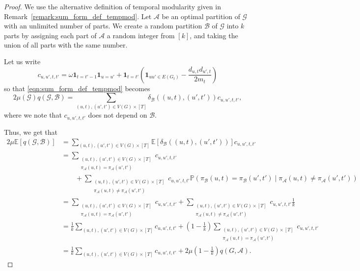 \documentclass[runningheads]{llncs}
\newcommand{\cA}{\mathcal{A}}
\newcommand{\cG}{\mathcal{G}}
\newcommand{\BB}{\mathcal{B}}
\newcommand{\ind}[1]{\mathbf{1}_{#1}}
\newcommand{\Exp}[1]{\mathbb{E}\left[#1\right]}
\newcommand{\Prob}[1]{\mathbb{P}\left(#1\right)}
\begin{document}
\begin{proof}
    We use the alternative definition of temporal modularity given in Remark~\ref{remark:sum_form_def_tempmod}. Let $\cA$ be an optimal partition of $\cG$ with an unlimited number of parts. We create a random partition $\BB$ of $\cG$ into $k$ parts by assigning each part of $\cA$ a random integer from $[k]$, and taking the union of all parts with the same number.

    Let us write
    $$c_{u,u',t,t'} = \omega\ind{t = t'-1}\ind{u = u'} + \ind{t = t'}\left(\ind{uu' \in E(G_t)} - \frac{d_{u,t} d_{u',t}}{2m_t}\right)$$
    so that \eqref{eqn:sum_form_def_tempmod} becomes
    $$2\mu(\cG) q(\cG,\BB) = \sum_{(u,t),(u',t') \in V(G)\times[T]} \delta_{\BB}((u,t),(u',t')) c_{u,u',t,t'},$$
    where we note that $c_{u,u',t,t'}$ does not depend on $\BB$.

    Thus, we get that
    \begin{align*}
        2\mu\Exp{q(\cG,\BB)} &= \sum_{(u,t),(u',t')\in V(G)\times [T]} \Exp{\delta_{\BB}((u,t),(u',t'))}c_{u,u',t,t'}\\
        &= \sum_{\substack{(u,t),(u',t')\in V(G)\times [T]\\\pi_\cA(u,t) = \pi_\cA(u',t')}} c_{u,u',t,t'}\\
        &\qquad + \sum_{\substack{(u,t),(u',t')\in V(G)\times [T]\\\pi_\cA(u,t) \neq \pi_\cA(u',t')}} c_{u,u',t,t'}\Prob{\pi_\BB(u,t) = \pi_\BB(u',t') \middle\vert \pi_\cA(u,t) \neq \pi_\cA(u',t')}\\
        &= \sum_{\substack{(u,t),(u',t')\in V(G)\times [T]\\\pi_\cA(u,t) = \pi_\cA(u',t')}} c_{u,u',t,t'} + \sum_{\substack{(u,t),(u',t')\in V(G)\times [T]\\\pi_\cA(u,t) \neq \pi_\cA(u',t')}} c_{u,u',t,t'}\frac{1}{k}\\
        &= \frac{1}{k}\sum_{(u,t),(u',t') \in V(G)\times [T]} c_{u,u',t,t'} + \left(1 - \frac{1}{k}\right)\sum_{\substack{(u,t),(u',t')\in V(G)\times [T]\\\pi_\cA(u,t) = \pi_\cA(u',t')}} c_{u,u',t,t'}\\
        &= \frac{1}{k}\sum_{(u,t),(u',t') \in V(G)\times [T]} c_{u,u',t,t'} + 2\mu\left(1 - \frac{1}{k}\right)q(G,\cA).
    \end{align*}


\end{proof}
\end{document}
